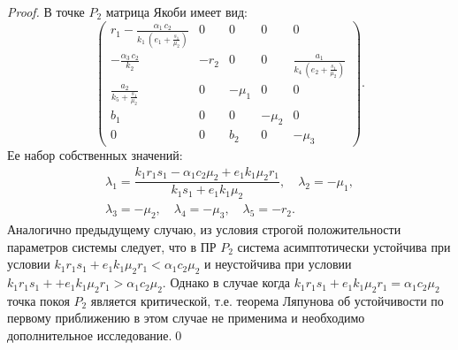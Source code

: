 \documentclass[14pt,a4paper]{extarticle}
\begin{document}
\begin{proof}
		В точке $P_2$ матрица Якоби имеет вид:
		\[\begin{pmatrix}
			r_{1}-\frac{\alpha _{1}\,c_{2}}{k_{1}\,\left(e_{1}+\frac{s_{1}}{\mu _{2}}\right)} & 0 & 0 & 0 & 0\\ 
			-\frac{\alpha _{3}\,c_{2}}{k_{2}} & -r_{2} & 0 & 0 & \frac{a_{1}}{k_{4}\,\left(e_{2}+\frac{s_{1}}{\mu _{2}}\right)}\\ 
			\frac{a_{2}}{k_{5}+\frac{s_{1}}{\mu _{2}}} & 0 & -\mu _{1} & 0 & 0\\ 
			b_{1} & 0 & 0 & -\mu _{2} & 0\\ 
			0 & 0 & b_{2} & 0 & -\mu _{3}
		\end{pmatrix}.\]
		Ее набор собственных значений:
		\begin{multline*}
		\lambda_1=\dfrac{k_1r_1s_1 - \alpha_1c_2\mu_2 + e_1k_1\mu_2r_1}{k_1s_1 + e_1k_1\mu_2},\quad \lambda_2=-\mu_1,\\
		\lambda_3=-\mu_2,\quad \lambda_4=-\mu_3,\quad \lambda_5=-r_2.
		\end{multline*}
		Аналогично предыдущему случаю, из условия строгой положительности параметров системы следует, что в ПР $P_2$ система асимптотически устойчива при условии $k_1r_1s_1 + e_1k_1\mu_2r_1< \alpha_1c_2\mu_2$ и неустойчива при условии $k_1r_1s_1 + + e_1k_1\mu_2r_1>\alpha_1c_2\mu_2$. Однако в случае когда $k_1r_1s_1 + e_1k_1\mu_2r_1=\alpha_1c_2\mu_2$ точка покоя $P_2$ является критической, т.е. теорема Ляпунова об устойчивости по первому приближению в этом случае не применима и необходимо дополнительное исследование.\qed
	\end{proof}
	
\end{document}
